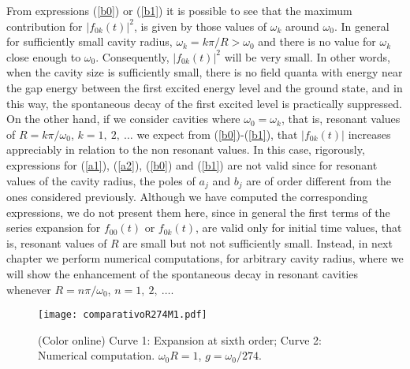\documentclass[10pt,english,twocolumn]{revtex4}
\begin{document}
From expressions (\ref{b0}) or (\ref{b1}) it is possible to see that the maximum contribution for $|f_{0k}(t)|^2$, is given by
those values of $\omega_k$ around $\omega_0$. In general for sufficiently small cavity radius, $\omega_k=k\pi/R>\omega_0$ and 
there is no value for $\omega_k$ close enough to $\omega_0$. Consequently,  $|f_{0k}(t)|^2$ will be very small. In other words,
when the cavity size is sufficiently small, there is no field quanta with energy near the gap energy between the first excited energy
level and the ground state, and in this way, the spontaneous decay of the first excited level is practically suppressed. On the other
hand, if we consider cavities where 
$\omega_0=\omega_k$, that is, resonant values of $R=k\pi/\omega_0$, $k=1,\ 2,\ \ldots$ we expect from (\ref{b0})-(\ref{b1}), that
 $|f_{0k}(t)|$ increases appreciably in
relation to the non resonant values. In this case, rigorously, expressions for (\ref{a1}), (\ref{a2}),  (\ref{b0}) and (\ref{b1}) are not valid since
for resonant values of the cavity radius, the poles of $a_j$ and $b_j$ are of order different from the ones considered previously.
Although we have computed the corresponding expressions, we do not present them here, since in general the first terms
of the series expansion for $f_{00}(t)$ or $f_{0k}(t)$, are valid only for initial time values, that is, resonant values of $R$ are small but not not
sufficiently small.
Instead, in next chapter we perform
numerical computations,  for arbitrary cavity radius, where we will show the  enhancement of the spontaneous decay
in resonant cavities whenever  $R=n\pi/\omega_0$, $n=1,\ 2,\ \ldots$.

\begin{figure}[b!]
\texttt{[image: comparativoR274M1.pdf]}
 \caption{(Color online) Curve 1: Expansion at sixth order;
 Curve 2: Numerical computation.
 $\omega_0R=1$, $g=\omega_0/274$. }
\label{fig4}
\end{figure} 
\end{document}
